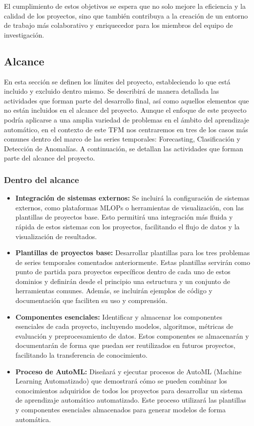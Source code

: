El cumplimiento de estos objetivos se espera que no solo mejore la eficiencia y la calidad de los 
proyectos, sino que también contribuya a la creación de un entorno de trabajo más colaborativo y
enriquecedor para los miembros del equipo de investigación.

\subsection{Alcance}
En esta sección se definen los límites del proyecto, estableciendo lo que está
incluido y excluido dentro mismo. Se describirá de manera detallada las
actividades que forman parte del desarrollo final, así como aquellos elementos
que no están incluidos en el alcance del proyecto. Aunque el enfoque de este 
proyecto podría aplicarse a una amplia variedad de problemas en el ámbito del 
aprendizaje automático, en el contexto de este TFM nos centraremos en tres de 
los casos más comunes dentro del marco de las series temporales: Forecasting, 
Clasificación y Detección de Anomalías. A continuación, se detallan las 
actividades que forman parte del alcance del proyecto.

\subsubsection{Dentro del alcance}
\begin{itemize}
    \item \textbf{Integración de sistemas externos:} Se incluirá la configuración de sistemas 
    externos, como plataformas MLOPs o herramientas de visualización, con las plantillas 
    de proyectos base. Esto permitirá una integración más fluida y rápida de estos sistemas con 
    los proyectos, facilitando el flujo de datos y la visualización de resultados.
    \item \textbf{Plantillas de proyectos base:} Desarrollar plantillas para 
    los tres problemas de series temporales comentados anteriormente. Estas plantillas 
    servirán como punto de partida para proyectos específicos dentro de cada uno de estos dominios
    y definirán desde el principio una estructura y un conjunto de herramientas comunes. Además,
    se incluirán ejemplos de código y documentación que faciliten su uso y comprensión.
    \item \textbf{Componentes esenciales:} Identificar y almacenar los componentes 
    esenciales de cada proyecto, incluyendo modelos, algoritmos, métricas de evaluación y
    preprocesamiento de datos. Estos componentes se almacenarán y documentarán de forma
    que puedan ser reutilizados en futuros proyectos, facilitando la transferencia de conocimiento.
    \item \textbf{Proceso de AutoML:} Diseñará y ejecutar procesos de AutoML 
    (Machine Learning Automatizado) que demostrará cómo se pueden combinar los conocimientos 
    adquiridos de todos los proyectos para desarrollar un sistema de aprendizaje automático 
    automatizado. Este proceso utilizará las plantillas y componentes esenciales almacenados 
    para generar modelos de forma automática.
\end{itemize}

